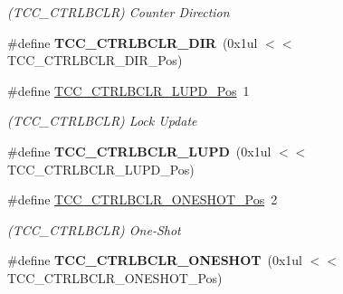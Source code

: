 \begin{DoxyCompactItemize}
\begin{DoxyCompactList}\small\item\em (T\+C\+C\+\_\+\+C\+T\+R\+L\+B\+C\+L\+R) Counter Direction \end{DoxyCompactList}\item 
\hypertarget{group___s_a_m_l21___t_c_c_gaf475b6ae2792f24323293957c4d672a2}{}\#define {\bfseries T\+C\+C\+\_\+\+C\+T\+R\+L\+B\+C\+L\+R\+\_\+\+D\+I\+R}~(0x1ul $<$$<$ T\+C\+C\+\_\+\+C\+T\+R\+L\+B\+C\+L\+R\+\_\+\+D\+I\+R\+\_\+\+Pos)\label{group___s_a_m_l21___t_c_c_gaf475b6ae2792f24323293957c4d672a2}

\item 
\hypertarget{group___s_a_m_l21___t_c_c_ga58321b78be02a1f72d080a45e808f208}{}\#define \hyperlink{group___s_a_m_l21___t_c_c_ga58321b78be02a1f72d080a45e808f208}{T\+C\+C\+\_\+\+C\+T\+R\+L\+B\+C\+L\+R\+\_\+\+L\+U\+P\+D\+\_\+\+Pos}~1\label{group___s_a_m_l21___t_c_c_ga58321b78be02a1f72d080a45e808f208}

\begin{DoxyCompactList}\small\item\em (T\+C\+C\+\_\+\+C\+T\+R\+L\+B\+C\+L\+R) Lock Update \end{DoxyCompactList}\item 
\hypertarget{group___s_a_m_l21___t_c_c_ga1639a9e2f6ee1dbf905f64adc4a7e36b}{}\#define {\bfseries T\+C\+C\+\_\+\+C\+T\+R\+L\+B\+C\+L\+R\+\_\+\+L\+U\+P\+D}~(0x1ul $<$$<$ T\+C\+C\+\_\+\+C\+T\+R\+L\+B\+C\+L\+R\+\_\+\+L\+U\+P\+D\+\_\+\+Pos)\label{group___s_a_m_l21___t_c_c_ga1639a9e2f6ee1dbf905f64adc4a7e36b}

\item 
\hypertarget{group___s_a_m_l21___t_c_c_ga4261eae7e9113fdce72f927c5082982b}{}\#define \hyperlink{group___s_a_m_l21___t_c_c_ga4261eae7e9113fdce72f927c5082982b}{T\+C\+C\+\_\+\+C\+T\+R\+L\+B\+C\+L\+R\+\_\+\+O\+N\+E\+S\+H\+O\+T\+\_\+\+Pos}~2\label{group___s_a_m_l21___t_c_c_ga4261eae7e9113fdce72f927c5082982b}

\begin{DoxyCompactList}\small\item\em (T\+C\+C\+\_\+\+C\+T\+R\+L\+B\+C\+L\+R) One-\/\+Shot \end{DoxyCompactList}\item 
\hypertarget{group___s_a_m_l21___t_c_c_gafe70762c8d516aa9da757bb877255f1e}{}\#define {\bfseries T\+C\+C\+\_\+\+C\+T\+R\+L\+B\+C\+L\+R\+\_\+\+O\+N\+E\+S\+H\+O\+T}~(0x1ul $<$$<$ T\+C\+C\+\_\+\+C\+T\+R\+L\+B\+C\+L\+R\+\_\+\+O\+N\+E\+S\+H\+O\+T\+\_\+\+Pos)\label{group___s_a_m_l21___t_c_c_gafe70762c8d516aa9da757bb877255f1e}


\end{DoxyCompactItemize}
